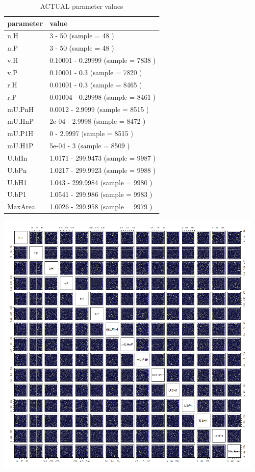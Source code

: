 \documentclass[]{book}
\begin{document}
\begin{table}[!h]

\caption{\label{tab:5LHStablepdf}ACTUAL parameter values}
\centering
\begin{tabular}{l|l}
\hline
parameter & value\\
\hline
n.H & 3 - 50 (sample = 48 )\\
\hline
n.P & 3 - 50 (sample = 48 )\\
\hline
v.H & 0.10001 - 0.29999 (sample = 7838 )\\
\hline
v.P & 0.10001 - 0.3 (sample = 7820 )\\
\hline
r.H & 0.01001 - 0.3 (sample = 8465 )\\
\hline
r.P & 0.01004 - 0.29998 (sample = 8461 )\\
\hline
mU.PnH & 0.0012 - 2.9999 (sample = 8515 )\\
\hline
mU.HnP & 2e-04 - 2.9998 (sample = 8472 )\\
\hline
mU.P1H & 0 - 2.9997 (sample = 8515 )\\
\hline
mU.H1P & 5e-04 - 3 (sample = 8509 )\\
\hline
U.bHn & 1.0171 - 299.9473 (sample = 9987 )\\
\hline
U.bPn & 1.0217 - 299.9923 (sample = 9988 )\\
\hline
U.bH1 & 1.043 - 299.9984 (sample = 9980 )\\
\hline
U.bP1 & 1.0541 - 299.986 (sample = 9983 )\\
\hline
MaxArea & 1.0026 - 299.958 (sample = 9979 )\\
\hline
\end{tabular}
\end{table}

\newpage

\includegraphics[width=1\linewidth]{plots/5_multiplePar-LHS_pairs-plot}
\end{document}
